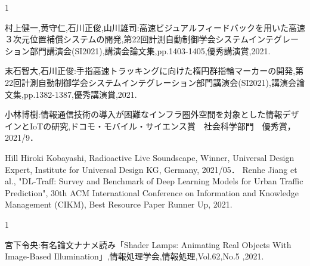 \begin{受賞}{1}

村上健一,黄守仁,石川正俊,山川雄司:高速ビジュアルフィードバックを用いた高速３次元位置補償システムの開発,第22回計測自動制御学会システムインテグレーション部門講演会(SI2021),講演会論文集,pp.1403-1405,優秀講演賞,2021.

末石智大,石川正俊:手指高速トラッキングに向けた楕円群指輪マーカーの開発,第22回計測自動制御学会システムインテグレーション部門講演会(SI2021),講演会論文集,pp.1382-1387,優秀講演賞,2021.

小林博樹:情報通信技術の導入が困難なインフラ圏外空間を対象とした情報デザインとIoTの研究,ドコモ・モバイル・サイエンス賞　社会科学部門　優秀賞，2021/9．

Hill Hiroki Kobayashi, Radioactive Live Soundscape, Winner, Universal Design Expert, Institute for Universal Design KG, Germany, 2021/05．
Renhe Jiang et al., "DL-Traff: Survey and Benchmark of Deep Learning Models for Urban Traffic Prediction", 30th ACM International Conference on Information and Knowledge Management (CIKM), Best Resource Paper Runner Up, 2021.

\end{受賞}

\begin{著書}{1}

宮下令央:有名論文ナナメ読み「Shader Lamps: Animating Real Objects With Image-Based Illumination」,情報処理学会,情報処理,Vol.62,No.5 ,2021.


\end{著書}

